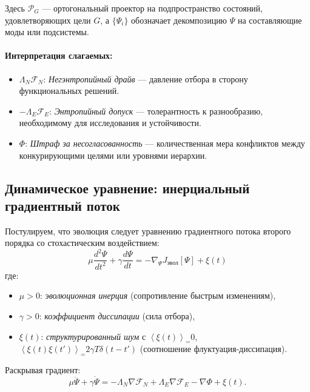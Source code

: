 \documentclass[11pt,a4paper]{article}
\theoremstyle{plain}
\theoremstyle{definition}
\theoremstyle{remark}
\newcommand{\Foam}{\Phi}
\newcommand{\Projector}{\mathcal{P}}
\newcommand{\Functional}{\mathcal{F}}
\newcommand{\grad}{\nabla}
\newcommand{\expect}[2]{\left\langle#1\right\rangle_{#2}}
\begin{document}
\noindent Здесь $\Projector_G$ --- ортогональный проектор на подпространство состояний, удовлетворяющих цели $G$, а $\{\Psi_i\}$ обозначает декомпозицию $\Psi$ на составляющие моды или подсистемы.

\paragraph{Интерпретация слагаемых:}
\begin{itemize}
    \item $\Lambda_N \Functional_N$: \textit{Негэнтропийный драйв} --- давление отбора в сторону функциональных решений.
    \item $-\Lambda_E \Functional_E$: \textit{Энтропийный допуск} --- толерантность к разнообразию, необходимому для исследования и устойчивости.
    \item $\Foam$: \textit{Штраф за несогласованность} --- количественная мера конфликтов между конкурирующими целями или уровнями иерархии.
\end{itemize}

\subsection{Динамическое уравнение: инерциальный градиентный поток}

Постулируем, что эволюция следует уравнению градиентного потока второго порядка со стохастическим воздействием:
\begin{equation}
\boxed{
\mu \frac{d^2\Psi}{dt^2} + \gamma \frac{d\Psi}{dt} = -\grad_{\Psi} J_{\text{эвол}}[\Psi] + \xi(t)
}
\label{eq:dynamics}
\end{equation}
где:
\begin{itemize}
    \item $\mu > 0$: \textit{эволюционная инерция} (сопротивление быстрым изменениям),
    \item $\gamma > 0$: \textit{коэффициент диссипации} (сила отбора),
    \item $\xi(t)$: \textit{структурированный шум} с $\expect{\xi(t)} = 0$, $\expect{\xi(t)\xi(t')} = 2\gamma T \delta(t-t')$ (соотношение флуктуация-диссипация).
\end{itemize}

Раскрывая градиент:
\begin{equation}
\mu \ddot{\Psi} + \gamma \dot{\Psi} = -\Lambda_N \grad\Functional_N + \Lambda_E \grad\Functional_E - \grad\Foam + \xi(t).
\label{eq:dynamics_expanded}
\end{equation}
\end{document}
